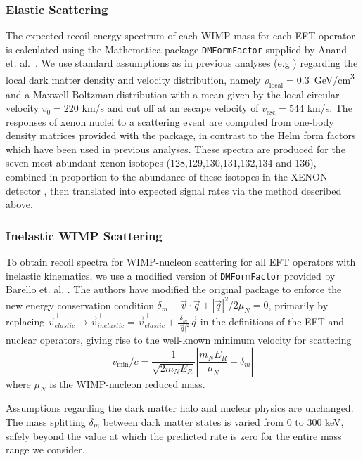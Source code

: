 %

\subsubsection{Elastic Scattering}
\label{subsubsec:Elastic}

The expected recoil energy spectrum of each WIMP mass for each EFT operator is calculated using the Mathematica package \texttt{DMFormFactor} supplied by Anand et. al.~\cite{Fitzpatrick:MathTools,Anand:MathTools}. We use standard assumptions as in previous analyses (e.g \cite{xe100_run_combination}) regarding the local dark matter density and velocity distribution, namely $\rho_\mathrm{local} = 0.3$~GeV/cm\textsuperscript{3} and a Maxwell-Boltzman distribution with a mean given by the local circular velocity $v_0 = 220$ km/s and cut off at an escape velocity of $v_\mathrm{esc} = 544$ km/s. The responses of xenon nuclei to a scattering event are computed from one-body density matrices provided with the package, in contrast to the Helm form factors which have been used in previous analyses. These spectra are produced for the seven most abundant xenon isotopes (128,129,130,131,132,134 and 136), combined in proportion to the abundance of these isotopes in the XENON detector \cite{xe100_run10_sd}, then translated into expected signal rates via the method described above.

\subsubsection{Inelastic WIMP Scattering}
\label{subsubsec:Inelastic}
To obtain recoil spectra for WIMP-nucleon scattering for all EFT operators with inelastic kinematics, we use a modified version of \texttt{DMFormFactor} provided by Barello et. al. \cite{InelasticMath}. The authors have modified the original package to enforce the new energy conservation condition $\delta_m + \vec{v}\cdot\vec{q} + \left|\vec{q}\right|^2/2\mu_N = 0$, primarily by replacing 
$\vec{v}^\perp_{elastic} \rightarrow \vec{v}^\perp_{inelastic} = \vec{v}^\perp_{elastic} +\frac{\delta_m}{\vert{\vec{q}}\vert^2}\vec{q}$ in the definitions of the EFT and nuclear operators, giving rise to the well-known minimum velocity for scattering
\begin{equation}
  v_\mathrm{min}/c = \frac{1}{\sqrt{2 m_N E_R}} \left|\frac{m_N E_R}{\mu_N} + \delta_m\right|
\end{equation}
where $\mu_N$ is the WIMP-nucleon reduced mass.

Assumptions regarding the dark matter halo and nuclear physics are unchanged. The mass splitting $\delta_m$ between dark matter states is varied from 0 to 300 keV, safely beyond the value at which the predicted rate is zero for the entire mass range we consider.
